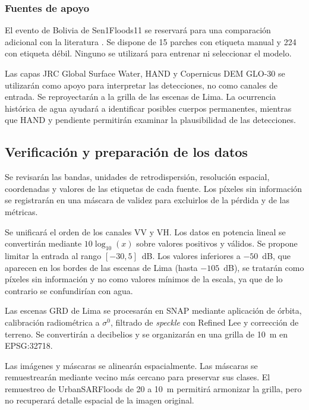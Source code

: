 \documentclass[conference]{IEEEtran}
\begin{document}
\subsubsection{Fuentes de apoyo}

El evento de Bolivia de Sen1Floods11 se reservará
para una comparación adicional con la literatura
\cite{bonafilia2020sen1floods11}.
Se dispone de 15 parches con etiqueta manual
y 224 con etiqueta débil. Ninguno se utilizará
para entrenar ni seleccionar el modelo.

Las capas JRC Global Surface Water, HAND y
Copernicus DEM GLO-30 se utilizarán como apoyo
para interpretar las detecciones, no como
canales de entrada. Se reproyectarán a la
grilla de las escenas de Lima. La ocurrencia
histórica de agua ayudará a identificar
posibles cuerpos permanentes, mientras que
HAND y pendiente permitirán examinar la
plausibilidad de las detecciones.

\subsection{Verificación y preparación de los datos}
\label{subsec:preparacion}

Se revisarán las bandas, unidades de retrodispersión,
resolución espacial, coordenadas y valores de las
etiquetas de cada fuente. Los píxeles sin información
se registrarán en una máscara de validez para
excluirlos de la pérdida y de las métricas.

Se unificará el orden de los canales VV y VH.
Los datos en potencia lineal se convertirán
mediante $10\log_{10}(x)$ sobre valores positivos
y válidos. Se propone limitar la entrada al rango
$[-30,5]$~dB. Los valores inferiores a $-50$~dB,
que aparecen en los bordes de las escenas de Lima
(hasta $-105$~dB), se tratarán como píxeles sin
información y no como valores mínimos de la escala,
ya que de lo contrario se confundirían con agua.

Las escenas GRD de Lima se procesarán en SNAP
mediante aplicación de órbita, calibración
radiométrica a $\sigma^{0}$, filtrado de
\textit{speckle} con Refined Lee y corrección
de terreno. Se convertirán a decibelios
y se organizarán en una grilla de 10~m
en EPSG:32718.

Las imágenes y máscaras se alinearán espacialmente.
Las máscaras se remuestrearán mediante vecino
más cercano para preservar sus clases.
El remuestreo de UrbanSARFloods de 20 a 10~m
permitirá armonizar la grilla, pero no recuperará
detalle espacial de la imagen original.
\end{document}
